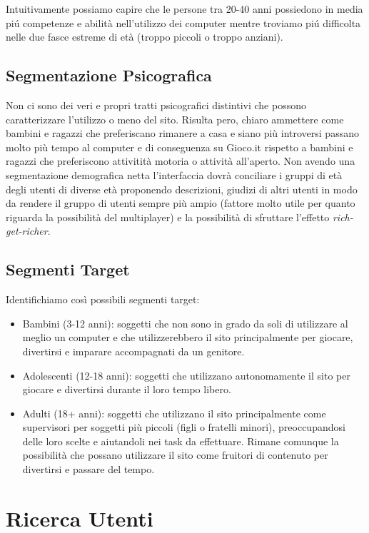 \documentclass[../Report.tex]{subfiles}
\begin{document}
    Intuitivamente possiamo capire che le persone tra 20-40 anni possiedono in media piú competenze e abilità nell’utilizzo dei computer mentre troviamo piú difficolta nelle due fasce estreme di età (troppo piccoli o troppo anziani).
    
    \subsection{Segmentazione Psicografica}

    Non ci sono dei veri e propri tratti psicografici distintivi che possono caratterizzare l'utilizzo o meno del sito. Risulta pero, chiaro ammettere come bambini e ragazzi che preferiscano rimanere a casa e siano più introversi passano molto più tempo al computer e di conseguenza su Gioco.it rispetto a bambini e ragazzi che preferiscono attivitità motoria o attività all'aperto. 
    Non avendo una segmentazione demografica netta l’interfaccia dovrà conciliare i gruppi di età degli utenti di diverse età proponendo descrizioni, giudizi di altri utenti in modo da rendere il gruppo di utenti sempre più ampio (fattore molto utile per quanto riguarda la possibilità del multiplayer) e la possibilità di sfruttare l'effetto \emph{rich-get-richer}.

    \subsection{Segmenti Target}
    Identifichiamo così possibili segmenti target:
    \begin{itemize}
        \item Bambini (3-12 anni): soggetti che non sono in grado da soli di utilizzare al meglio un computer e che utilizzerebbero il sito principalmente per giocare, divertirsi e imparare accompagnati da un genitore.
        \item Adolescenti (12-18 anni): soggetti che utilizzano autonomamente il sito per giocare e divertirsi durante il loro tempo libero. 
        \item Adulti (18+ anni): soggetti che utilizzano il sito principalmente come supervisori per soggetti più piccoli (figli o fratelli minori), preoccupandosi delle loro scelte e aiutandoli nei task da effettuare. Rimane comunque la possibilità che possano utilizzare il sito come fruitori di contenuto per divertirsi e passare del tempo.       
    \end{itemize}

    \section{Ricerca Utenti}
    
\end{document}
